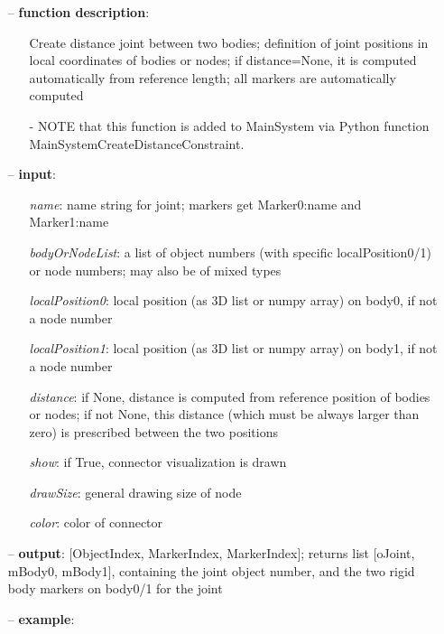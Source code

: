 \begin{itemize}[leftmargin=0.7cm]
\item[--]
{\bf function description}: \vspace{-6pt}
\begin{itemize}[leftmargin=1.2cm]
\setlength{\itemindent}{-0.7cm}
\item[]Create distance joint between two bodies; definition of joint positions in local coordinates of bodies or nodes; if distance=None, it is computed automatically from reference length; all markers are automatically computed
\item[]- NOTE that this function is added to MainSystem via Python function MainSystemCreateDistanceConstraint.
\end{itemize}
\item[--]
{\bf input}: \vspace{-6pt}
\begin{itemize}[leftmargin=1.2cm]
\setlength{\itemindent}{-0.7cm}
\item[]{\it name}: name string for joint; markers get Marker0:name and Marker1:name
\item[]{\it bodyOrNodeList}: a list of object numbers (with specific localPosition0/1) or node numbers; may also be of mixed types
\item[]{\it localPosition0}: local position (as 3D list or numpy array) on body0, if not a node number
\item[]{\it localPosition1}: local position (as 3D list or numpy array) on body1, if not a node number
\item[]{\it distance}: if None, distance is computed from reference position of bodies or nodes; if not None, this distance (which must be always larger than zero) is prescribed between the two positions
\item[]{\it show}: if True, connector visualization is drawn
\item[]{\it drawSize}: general drawing size of node
\item[]{\it color}: color of connector
\end{itemize}
\item[--]
{\bf output}: [ObjectIndex, MarkerIndex, MarkerIndex]; returns list [oJoint, mBody0, mBody1], containing the joint object number, and the two rigid body markers on body0/1 for the joint
\item[--]
{\bf example}: \vspace{-12pt}\ei\begin{lstlisting}[language=Python, xleftmargin=36pt]

\end{lstlisting}
\end{itemize}
